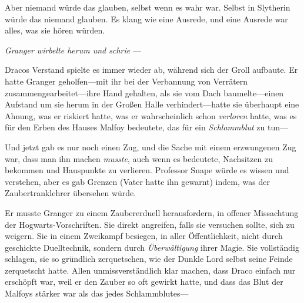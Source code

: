 Aber niemand würde das glauben, selbst wenn es wahr war. Selbst in Slytherin würde das niemand glauben. Es klang wie eine Ausrede, und eine Ausrede war alles, was sie hören würden.

\emph{Granger wirbelte herum und schrie }—

Dracos Verstand spielte es immer wieder ab, während sich der Groll aufbaute. Er hatte Granger geholfen—mit ihr bei der Verbannung von Verrätern zusammengearbeitet—ihre Hand gehalten, als sie vom Dach baumelte—einen Aufstand um sie herum in der Großen Halle verhindert—hatte sie überhaupt eine Ahnung, was er riskiert hatte, was er wahrscheinlich schon \emph{verloren} hatte, was es für den Erben des Hauses Malfoy bedeutete, das für ein \emph{Schlammblut} zu tun—

Und jetzt gab es nur noch einen Zug, und die Sache mit einem erzwungenen Zug war, dass man ihn machen \emph{musste}, auch wenn es bedeutete, Nachsitzen zu bekommen und Hauspunkte zu verlieren. Professor Snape würde es wissen und verstehen, aber es gab Grenzen (Vater hatte ihn gewarnt) indem, was der Zaubertranklehrer übersehen würde.

Er musste Granger zu einem Zaubererduell herausfordern, in offener Missachtung der Hogwarts-Vorschriften. Sie direkt angreifen, falls sie versuchen sollte, sich zu weigern. Sie in einem Zweikampf besiegen, in aller Öffentlichkeit, nicht durch geschickte Duelltechnik, sondern durch \emph{Überwältigung} ihrer Magie. Sie vollständig schlagen, sie so gründlich zerquetschen, wie der Dunkle Lord selbst seine Feinde zerquetscht hatte. Allen unmissverständlich klar machen, dass Draco einfach nur erschöpft war, weil er den Zauber so oft gewirkt hatte, und dass das Blut der Malfoys stärker war als das jedes Schlammblutes—

